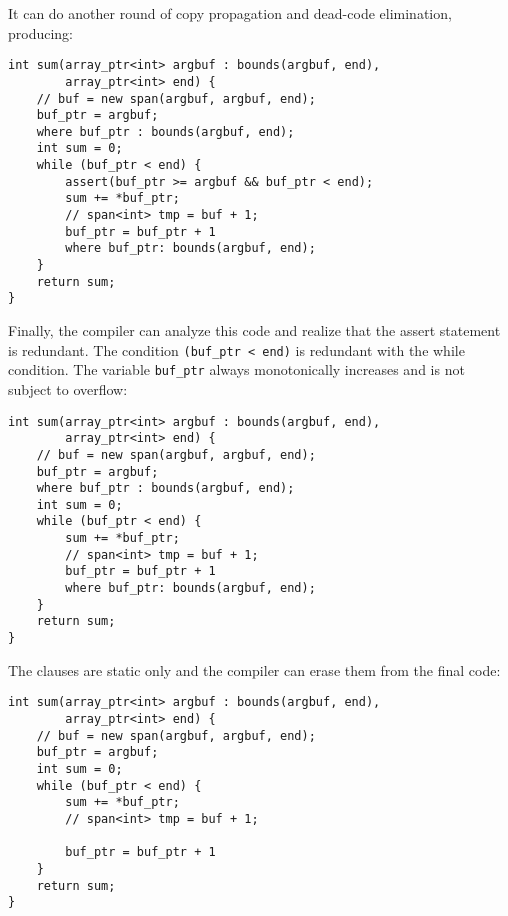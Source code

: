 It can do another round of copy propagation and dead-code elimination,
producing:

\begin{verbatim}
int sum(array_ptr<int> argbuf : bounds(argbuf, end), 
        array_ptr<int> end) {
    // buf = new span(argbuf, argbuf, end);
    buf_ptr = argbuf;
    where buf_ptr : bounds(argbuf, end);
    int sum = 0;
    while (buf_ptr < end) {
        assert(buf_ptr >= argbuf && buf_ptr < end);
        sum += *buf_ptr;
        // span<int> tmp = buf + 1;
        buf_ptr = buf_ptr + 1
        where buf_ptr: bounds(argbuf, end);
    }
    return sum;
}
\end{verbatim}

Finally, the compiler can analyze this code and realize that the assert
statement is redundant. The condition \texttt{(buf\_ptr \textless{}
end)} is redundant with the while condition. The variable
\texttt{buf\_ptr} always monotonically increases and is not subject to
overflow:
\begin{verbatim}
int sum(array_ptr<int> argbuf : bounds(argbuf, end), 
        array_ptr<int> end) {
    // buf = new span(argbuf, argbuf, end);
    buf_ptr = argbuf;
    where buf_ptr : bounds(argbuf, end);
    int sum = 0;
    while (buf_ptr < end) {
        sum += *buf_ptr;
        // span<int> tmp = buf + 1;
        buf_ptr = buf_ptr + 1
        where buf_ptr: bounds(argbuf, end);
    }
    return sum;
}
\end{verbatim}

The  clauses are static only and the compiler can erase
them from the final code:

\begin{verbatim}
int sum(array_ptr<int> argbuf : bounds(argbuf, end), 
        array_ptr<int> end) {
    // buf = new span(argbuf, argbuf, end);
    buf_ptr = argbuf;
    int sum = 0;
    while (buf_ptr < end) {
        sum += *buf_ptr;
        // span<int> tmp = buf + 1;

        buf_ptr = buf_ptr + 1
    }
    return sum;
}
\end{verbatim}